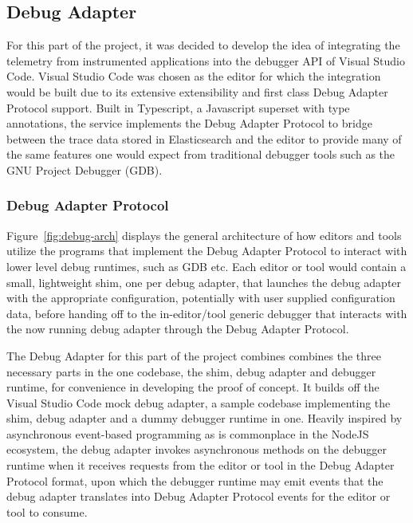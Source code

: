 \documentclass[12pt,pdftex,titlepage]{report}
\begin{document}
            \subsection{Debug Adapter}
                For this part of the project, it was decided to develop the idea of integrating the telemetry from instrumented applications into the debugger API of Visual Studio Code.
                Visual Studio Code was chosen as the editor for which the integration would be built due to its extensive extensibility and first class Debug Adapter Protocol support. 
                Built in Typescript, a Javascript superset with type annotations, the service implements the Debug Adapter Protocol to bridge between the trace data stored in Elasticsearch
                and the editor to provide many of the same features one would expect from traditional debugger tools such as the GNU Project Debugger (GDB).

                \subsubsection{Debug Adapter Protocol}
                    Figure~\ref{fig:debug-arch} displays the general architecture of how editors and tools utilize the programs that implement the Debug Adapter Protocol to interact with
                    lower level debug runtimes, such as GDB etc. Each editor or tool would contain a small, lightweight shim, one per debug adapter, that launches the debug adapter with the
                    appropriate configuration, potentially with user supplied configuration data, before handing off to the in-editor/tool generic debugger that interacts with the now running
                    debug adapter through the Debug Adapter Protocol.

                    The Debug Adapter for this part of the project combines combines the three necessary parts in the one codebase, the shim, debug adapter and debugger runtime, for convenience
                    in developing the proof of concept. It builds off the Visual Studio Code mock debug adapter\cite{mockdebug}, a sample codebase implementing the shim, debug adapter and a dummy debugger
                    runtime in one. Heavily inspired by asynchronous event-based programming as is commonplace in the NodeJS ecosystem, the debug adapter invokes asynchronous methods on the 
                    debugger runtime when it receives requests from the editor or tool in the Debug Adapter Protocol format, upon which the debugger runtime may emit events that the debug adapter
                    translates into Debug Adapter Protocol events for the editor or tool to consume.
\end{document}
